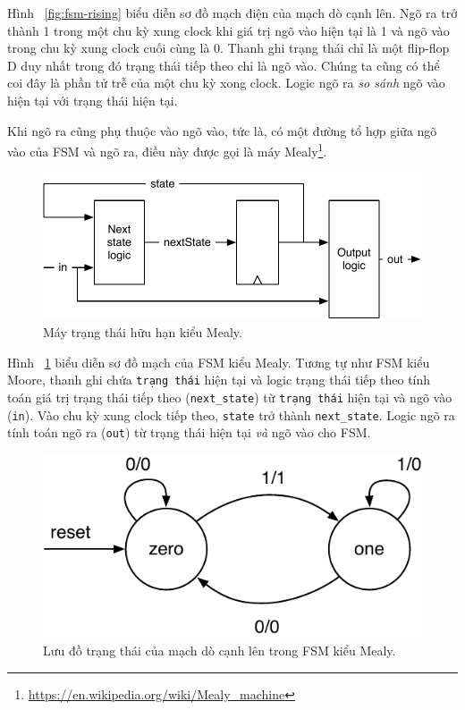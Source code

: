 \documentclass[%
    10pt,
    headinclude, footexclude,
    openright, %
    notitlepage,
    cleardoubleempty,
    headsepline,
    pointlessnumbers,
    bibtotoc, idxtotoc,
    ]{scrbook}
\newcommand{\code}[1]{{\small{\texttt{#1}}}}
\newcommand{\scale}{0.7}
\newcommand{\myref}[2]{\href{#1}{#2}}
\renewcommand{\myref}[2]{{#2}{\footnote{\url{#1}}}}
\begin{document}
Hình ~\ref{fig:fsm-rising} biểu diễn sơ đồ mạch điện của mạch dò cạnh lên. Ngõ ra trở thành 1 trong một chu kỳ xung clock khi giá trị ngõ vào hiện tại là 1 và ngõ vào trong chu kỳ xung clock cuối cùng là 0. Thanh ghi trạng thái chỉ là một flip-flop D duy nhất trong đó trạng thái tiếp theo chỉ là ngõ vào. Chúng ta cũng có thể coi đây là phần tử trễ của một chu kỳ xong clock. Logic ngõ ra \emph{so sánh} ngõ vào hiện tại với trạng thái hiện tại. 

Khi ngõ ra cũng phụ thuộc vào ngõ vào, tức là, có một đường tổ hợp giữa ngõ vào của FSM và ngõ ra, điều này được gọi là 
\myref{https://en.wikipedia.org/wiki/Mealy_machine}{máy Mealy}.

\begin{figure}
  \centering
  \includegraphics[scale=\scale]{figures/mealy}
  \caption{Máy trạng thái hữu hạn kiểu Mealy.}
  \label{fig:mealy}
\end{figure}

Hình ~\ref{fig:mealy} biểu diễn sơ đồ mạch của FSM kiểu Mealy. Tương tự như FSM kiểu Moore, thanh ghi chứa \code {trạng thái} hiện tại và logic trạng thái tiếp theo tính toán giá trị trạng thái tiếp theo (\code{next\_state}) từ \code{trạng thái} hiện tại và ngõ vào (\code{in}). Vào chu  kỳ xung clock tiếp theo, \code{state} trở thành \code{next\_state}. Logic ngõ ra tính toán ngõ ra (\code{out}) từ trạng thái hiện tại \emph{và} ngõ vào cho FSM. 

\begin{figure}
  \centering
  \includegraphics[scale=\scale]{figures/state-diag-mealy}
  \caption{Lưu đồ trạng thái của mạch dò cạnh lên trong FSM kiểu Mealy.}
  \label{fig:diag:mealy}
\end{figure}
\end{document}
